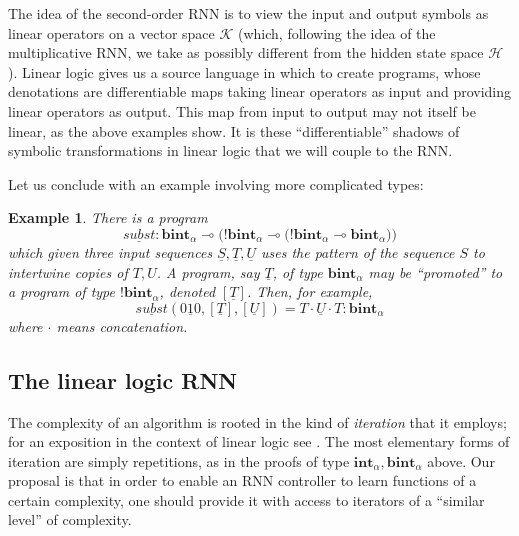 \documentclass[english,letter paper,12pt,leqno]{article}
\theoremstyle{example}
\newtheorem{example}[theorem]{Example}
\numberwithin{equation}{section}
\begin{document}
The idea of the second-order RNN is to view the input and output symbols as linear operators on a vector space $\mathscr{K}$ (which, following the idea of the multiplicative RNN, we take as possibly different from the hidden state space $\mathscr{H}$). Linear logic gives us a source language in which to create programs, whose denotations are differentiable maps taking linear operators as input and providing linear operators as output. This map from input to output may not itself be linear, as the above examples show. It is these ``differentiable'' shadows of symbolic transformations in linear logic that we will couple to the RNN.
\vspace{0.2cm}

Let us conclude with an example involving more complicated types:

\begin{example} There is a program
\[
\underline{subst}: \textbf{bint}_\alpha \multimap \Big( {!}\textbf{bint}_\alpha \multimap \big( {!}\textbf{bint}_\alpha \multimap \textbf{bint}_\alpha \big)\Big)
\]
which given three input sequences $\underline{S}, \underline{T}, \underline{U}$ uses the pattern of the sequence $S$ to intertwine copies of $T,U$. A program, say $\underline{T}$, of type $\textbf{bint}_\alpha$ may be ``promoted'' to a program of type ${!} \textbf{bint}_\alpha$, denoted $[\underline{T}]$. Then, for example,
\[
\underline{subst}( \underline{010}, [\underline{T}], [\underline{U}] ) = \underline{T \cdot U \cdot T} : \textbf{bint}_\alpha
\]
where $\cdot$ means concatenation.
\end{example}

\subsection{The linear logic RNN}

The complexity of an algorithm is rooted in the kind of \emph{iteration} that it employs; for an exposition in the context of linear logic see \cite[\S]{murfet_logic}. The most elementary forms of iteration are simply repetitions, as in the proofs of type $\textbf{int}_\alpha, \textbf{bint}_\alpha$ above. Our proposal is that in order to enable an RNN controller to learn functions of a certain complexity, one should provide it with access to iterators of a ``similar level'' of complexity.

\end{document}
